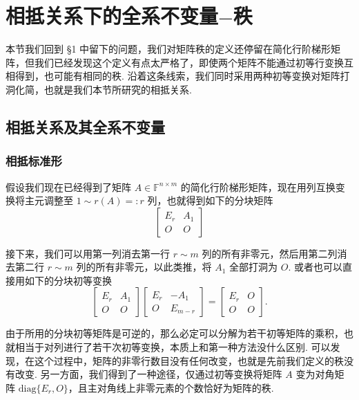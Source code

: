 \documentclass[10pt,openany]{article}
\theoremstyle{thmstyle} %
\theoremstyle{defstyle} %
\theoremstyle{prostyle} %
\theoremstyle{exastyle}
\theoremstyle{remstyle}
\newcommand{\F}{\mathbb{F}}
\newcommand{\nm}{^{n \times m}}
\newcommand{\diag}{\mathrm{diag}}
\begin{document}
\pagestyle{fancy}
\rhead{\today}
	
\setcounter{section}{2}


\section{相抵关系下的全系不变量\(-\)秩}

本节我们回到 \S 1 中留下的问题，我们对矩阵秩的定义还停留在简化行阶梯形矩阵，但我们已经发现这个定义有点太严格了，即使两个矩阵不能通过初等行变换互相得到，也可能有相同的秩. 沿着这条线索，我们同时采用两种初等变换对矩阵打洞化简，也就是我们本节所研究的相抵关系. 

\subsection{相抵关系及其全系不变量} \label{sec3.1}

\subsubsection{相抵标准形}

假设我们现在已经得到了矩阵 \( A \in \F\nm \) 的简化行阶梯形矩阵，现在用列互换变换将主元调整至 \( 1 \sim r(A)=:r \) 列，也就得到如下的分块矩阵
\[ \begin{bmatrix}
	E_r & A_1 \\
	O & O
\end{bmatrix} \]

接下来，我们可以用第一列消去第一行 \( r \sim m \) 列的所有非零元，然后用第二列消去第二行 \( r \sim m \) 列的所有非零元，以此类推，将 \( A_1 \) 全部打洞为 \( O \). 或者也可以直接用如下的分块初等变换
\[ \begin{bmatrix}
	E_r & A_1 \\
	O & O
\end{bmatrix}\begin{bmatrix}
E_r & -A_1 \\
O & E_{m-r}
\end{bmatrix}=\begin{bmatrix}
E_r & O \\
O & O
\end{bmatrix}. \]

由于所用的分块初等矩阵是可逆的，那么必定可以分解为若干初等矩阵的乘积，也就相当于对列进行了若干次初等变换，本质上和第一种方法没什么区别. 可以发现，在这个过程中，矩阵的非零行数目没有任何改变，也就是先前我们定义的秩没有改变. 另一方面，我们得到了一种途径，仅通过初等变换将矩阵 \( A \) 变为对角矩阵 \( \diag\{E_r,O\} \)，且主对角线上非零元素的个数恰好为矩阵的秩. 
\end{document}
